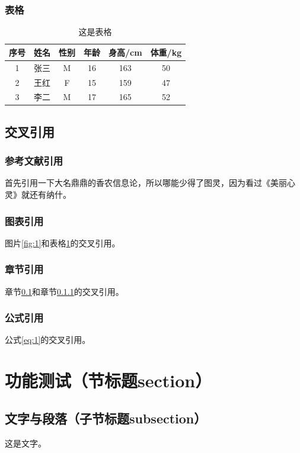 \begin{ujnbody}
    \subsubsection{表格}
    \begin{table}[!htbp]
        \centering
        \caption{这是表格}
        \begin{tabular}{cccccc}
            \toprule
            序号 & 姓名 & 性别 & 年龄 & 身高/cm & 体重/kg \\
            \midrule
            1 & 张三 & M & 16 & 163 & 50 \\
            2 & 王红 & F & 15 & 159 & 47 \\
            3 & 李二 & M & 17 & 165 & 52 \\
            \bottomrule
        \end{tabular}
        \label{tab:1}
    \end{table}
    \subsection{交叉引用}\label{sec:1}
    \subsubsection{参考文献引用}\label{sec:2}
    首先引用一下大名鼎鼎的香农信息论\cite{shannon1948mathematical}，所以哪能少得了图灵\cite{turing2009computing}，因为看过《美丽心灵》就还有纳什\cite{nash1996non}。
    \subsubsection{图表引用}
    图片\ref{fig:1}和表格\ref{tab:1}的交叉引用。
    \subsubsection{章节引用}
    章节\ref{sec:1}和章节\ref{sec:2}的交叉引用。
    \subsubsection{公式引用}
    公式\ref{eq:1}的交叉引用。
    \section{功能测试（节标题section）}
    \subsection{文字与段落（子节标题subsection）}
    这是文字。

\end{ujnbody}
